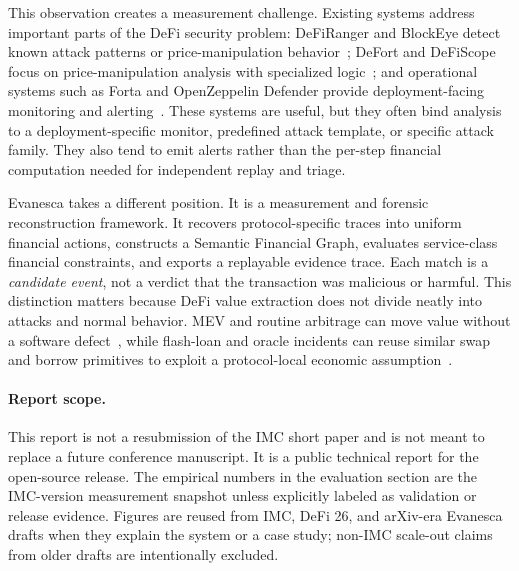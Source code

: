 \documentclass[10pt]{article}
\newcommand{\sys}{Evanesca\xspace}
\begin{document}
This observation creates a measurement challenge. Existing systems address
important parts of the DeFi security problem: DeFiRanger and BlockEye detect
known attack patterns or price-manipulation behavior~\cite{wu2021defiranger,wang2021blockeye};
DeFort and DeFiScope focus on price-manipulation analysis with specialized
logic~\cite{defort2024,zhong2025defiscope}; and operational systems such as
Forta and OpenZeppelin Defender provide deployment-facing monitoring and
alerting~\cite{forta2023whitepaper,ozdefender}. These systems are useful, but
they often bind analysis to a deployment-specific monitor, predefined attack
template, or specific attack family. They also tend to emit alerts rather than
the per-step financial computation needed for independent replay and triage.

\sys takes a different position. It is a measurement and forensic
reconstruction framework. It recovers protocol-specific traces into uniform
financial actions, constructs a Semantic Financial Graph, evaluates
service-class financial constraints, and exports a replayable evidence trace.
Each match is a \emph{candidate event}, not a verdict that the transaction was
malicious or harmful. This distinction matters because DeFi value extraction
does not divide neatly into attacks and normal behavior. MEV and routine
arbitrage can move value without a software defect~\cite{flashbots,weintraub2022flash,mevdef},
while flash-loan and oracle incidents can reuse similar swap and borrow
primitives to exploit a protocol-local economic assumption~\cite{qin2021attacking,zhou2023sok}.

\paragraph{Report scope.}
This report is not a resubmission of the IMC short paper and is not meant to
replace a future conference manuscript. It is a public technical report for the
open-source release. The empirical numbers in the evaluation section are the
IMC-version measurement snapshot unless explicitly labeled as validation or
release evidence. Figures are reused from IMC, DeFi 26, and arXiv-era Evanesca
drafts when they explain the system or a case study; non-IMC scale-out claims
from older drafts are intentionally excluded.
\end{document}
